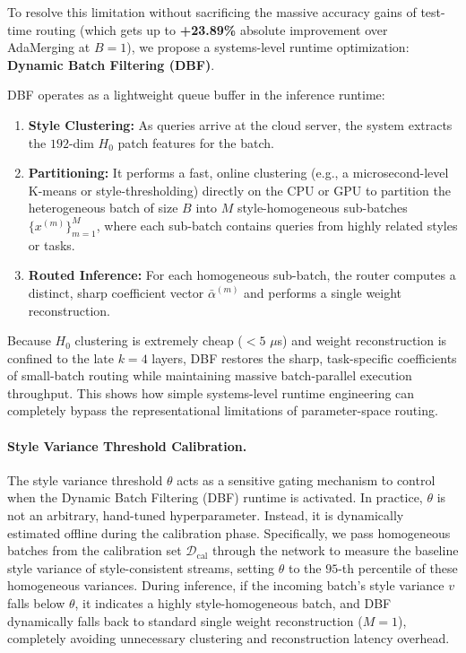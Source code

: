 To resolve this limitation without sacrificing the massive accuracy gains of test-time routing (which gets up to \textbf{+23.89\%} absolute improvement over AdaMerging at $B=1$), we propose a systems-level runtime optimization: \textbf{Dynamic Batch Filtering (DBF)}.

DBF operates as a lightweight queue buffer in the inference runtime:
\begin{enumerate}
    \item \textbf{Style Clustering:} As queries arrive at the cloud server, the system extracts the $192$-dim $H_0$ patch features for the batch.
    \item \textbf{Partitioning:} It performs a fast, online clustering (e.g., a microsecond-level K-means or style-thresholding) directly on the CPU or GPU to partition the heterogeneous batch of size $B$ into $M$ style-homogeneous sub-batches $\{x^{(m)}\}_{m=1}^M$, where each sub-batch contains queries from highly related styles or tasks.
    \item \textbf{Routed Inference:} For each homogeneous sub-batch, the router computes a distinct, sharp coefficient vector $\bar{\alpha}^{(m)}$ and performs a single weight reconstruction.
\end{enumerate}
Because $H_0$ clustering is extremely cheap ($< 5$ $\mu$s) and weight reconstruction is confined to the late $k=4$ layers, DBF restores the sharp, task-specific coefficients of small-batch routing while maintaining massive batch-parallel execution throughput. This shows how simple systems-level runtime engineering can completely bypass the representational limitations of parameter-space routing.

\paragraph{Style Variance Threshold Calibration.}
The style variance threshold $\theta$ acts as a sensitive gating mechanism to control when the Dynamic Batch Filtering (DBF) runtime is activated. In practice, $\theta$ is not an arbitrary, hand-tuned hyperparameter. Instead, it is dynamically estimated offline during the calibration phase. Specifically, we pass homogeneous batches from the calibration set $\mathcal{D}_{\text{cal}}$ through the network to measure the baseline style variance of style-consistent streams, setting $\theta$ to the $95$-th percentile of these homogeneous variances. During inference, if the incoming batch's style variance $v$ falls below $\theta$, it indicates a highly style-homogeneous batch, and DBF dynamically falls back to standard single weight reconstruction ($M=1$), completely avoiding unnecessary clustering and reconstruction latency overhead.

